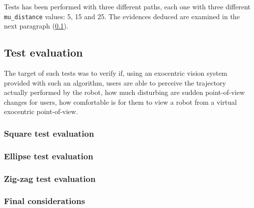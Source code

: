 %
Tests has been performed with three different paths, each one with three different \texttt{mu\_distance} values: 5, 15
and 25. The evidences deduced are examined in the next paragraph (\ref{subsec:testevaluation}).

\subsection{Test evaluation}
\label{subsec:testevaluation}
The target of such tests was to verify  if, using 
an exocentric vision system provided with such an algorithm, 
users are able to perceive the trajectory actually 
performed by the robot,  how much disturbing are 
sudden point-of-view changes for users,  how 
comfortable is for them to view a robot from a 
virtual exocentric point-of-view.
%
%

\subsubsection{Square test evaluation}
\label{subsubsec:squaretest}

\subsubsection{Ellipse test evaluation}
\label{subsubsec:ellipsetest}

\subsubsection{Zig-zag test evaluation}
\label{subsubsec:zigzagtest}

\subsubsection{Final considerations}
\label{subsubsec:finalconsiderations}
